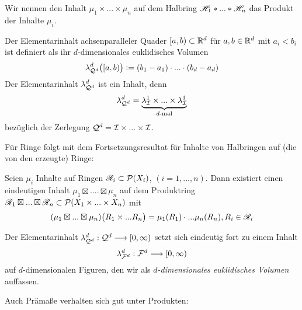 \begin{definition}
\begin{mdframed}
Wir nennen den Inhalt $\mu_1 \times ... \times \mu_n$ auf dem Halbring $\mathscr{H}_1 \ast ... \ast \mathscr{H}_n$ das Produkt der Inhalte $\mu_i$.
\end{mdframed}
\end{definition}

\begin{hauptbsp}
Der Elementarinhalt achsenparalleler Quader $[a,b) \subset \mathbb{R}^d$ für $a,b \in \mathbb{R}^d$ mit $a_i < b_i$ ist definiert als ihr $d$-dimensionales euklidisches Volumen
$$
\lambda^d_{\mathcal{Q}^d}\big([a,b)\big) := (b_1 -a_1) \cdot ... \cdot (b_d-a_d)
$$
Der Elementarinhalt $\lambda^d_{\mathcal{Q}^d}$ ist ein Inhalt, denn
$$
\lambda^d_{\mathcal{Q}^d} = \underbrace{\lambda^1_\mathcal{I} \times ... \times \lambda^1_\mathcal{I}}_{d\text{-mal}}
$$
bezüglich der Zerlegung $\mathcal{Q}^d = \mathcal{I} \times ... \times \mathcal{I}$.
\end{hauptbsp}

Für Ringe folgt mit dem Fortsetzungsresultat für Inhalte von Halbringen auf (die von den erzeugte) Ringe:

\begin{korollar}
Seien $\mu_i$ Inhalte auf Ringen $\mathscr{R}_i \subset \mathcal{P}(X_i)$, $(i=1,...,n)$. Dann existiert einen eindeutigen Inhalt $\mu_1 \boxtimes .... \boxtimes \mu_n$ auf dem Produktring $\mathscr{R}_1 \boxtimes ... \boxtimes \mathscr{R}_n \subset \mathcal{P}(X_1 \times ... \times X_n)$ mit
$$(\mu_1 \boxtimes ... \boxtimes \mu_n) \big( R_1 \times ... R_n\big) = \mu_1 (R_1) \cdot ... \mu_n(R_n), R_i \in \mathscr{R}_i$$
\end{korollar}

\begin{hauptbsp}
Der Elementarinhalt $\lambda^d_{\mathcal{Q}^d}: \mathcal{Q}^d \longrightarrow [0,\infty)$ setzt sich eindeutig fort zu einem Inhalt
$$
\lambda^d_{\mathcal{F}^d}: \mathcal{F}^d \longrightarrow [0,\infty)
$$
auf $d$-dimensionalen Figuren, den wir als \emph{$d$-dimensionales euklidisches Volumen} auffassen.
\end{hauptbsp}

Auch Prämaße verhalten sich gut unter Produkten:

